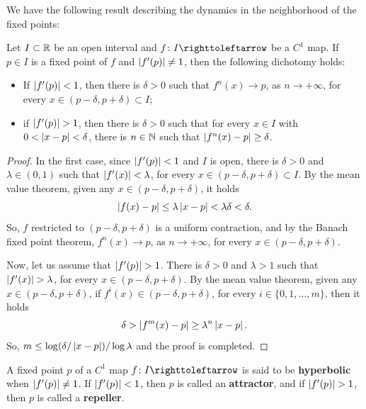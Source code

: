 We have the following result describing the dynamics in the neighborhood of the fixed points:

\begin{proposition}\label{prop:hyperbolic-fixed-points-dim-one}
  Let $I\subset\mathbb{R}$ be an open interval and $f\colon I\carr$ be a $C^1$ map. If $p\in I$ is a fixed point of $f$ and $\left\lvert{f'(p)}\right\rvert\neq 1$, then the following dichotomy holds:
  \begin{itemize}
    \item If $\left\lvert{f'(p)}\right\rvert<1$, then there is $\delta>0$ such that $f^n(x)\to p$, as $n\to+\infty$, for every $x\in (p-\delta,p+\delta)\subset I$;
    \item if $\left\lvert{f'(p)}\right\rvert>1$, then there is $\delta>0$ such that for every $x\in I$ with $0<\left\lvert{x-p}\right\rvert<\delta$, there is $n\in\mathbb{N}$ such that $\left\lvert{f^n(x)-p}\right\rvert\geq\delta$.
  \end{itemize}
\end{proposition}

\begin{proof}
  In the first case, since $\left\lvert{f'(p)}\right\rvert<1$ and $I$ is open, there is $\delta>0$ and $\lambda\in(0,1)$ such that $\left\lvert{f'(x)}\right\rvert<\lambda$, for every $x\in (p-\delta,p+\delta)\subset I$. By the mean value theorem, given any $x\in(p-\delta,p+\delta)$, it holds
  \begin{displaymath}
    \left\lvert{f(x)-p}\right\rvert\leq\lambda\left\lvert{x-p}\right\rvert<\lambda\delta<\delta.
  \end{displaymath}
  So, $f$ restricted to $(p-\delta,p+\delta)$ is a uniform contraction, and by the Banach fixed point theorem, $f^n(x)\to p$, as $n\to+\infty$, for every $x\in(p-\delta,p+\delta)$.

  Now, let us assume that $\left\lvert{f'(p)}\right\rvert>1$. There is $\delta>0$ and $\lambda>1$ such that $\left\lvert{f'(x)}\right\rvert>\lambda$, for every $x\in(p-\delta,p+\delta)$. By the mean value theorem, given any $x\in(p-\delta,p+\delta)$, if $f^i(x)\in(p-\delta,p+\delta)$, for every $i\in\{0,1,\ldots,m\}$, then it holds
  \begin{displaymath}
    \delta>\left\lvert{f^m(x)-p}\right\rvert\geq\lambda^n\left\lvert{x-p}\right\rvert.
  \end{displaymath}
  So,  $m\leq \log(\delta/\left\lvert{x-p}\right\rvert)/\log\lambda$ and the proof is completed.
\end{proof}

\begin{definition}
  \label{def:hyperbolic-fixed-point}
  A fixed point $p$ of a $C^1$ map $f\colon I\carr$ is said to be \textbf{hyperbolic} when $\left\lvert{f'(p)}\right\rvert\neq 1$. If $\left\lvert{f'(p)}\right\rvert<1$, then $p$ is called an \textbf{attractor}, and if $\left\lvert{f'(p)}\right\rvert>1$, then $p$ is called a \textbf{repeller}.
\end{definition}

